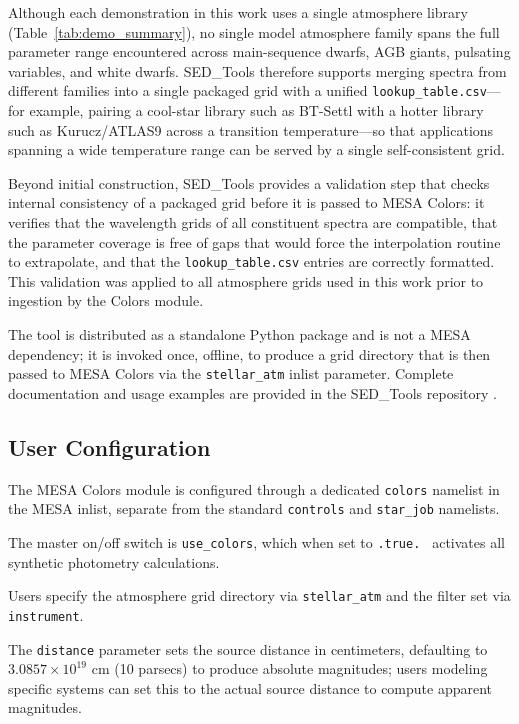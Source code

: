 \documentclass[linenumbers,apj,twocolumn, floatfix]{aastex701}
\begin{document}
Although each demonstration in this work uses a single atmosphere library (Table~\ref{tab:demo_summary}), no single model atmosphere family spans the full parameter range encountered across main-sequence dwarfs, AGB giants, pulsating variables, and white dwarfs.
SED\_Tools therefore supports merging spectra from different families into a single packaged grid with a unified \texttt{lookup\_table.csv}---for example, pairing a cool-star library such as BT-Settl with a hotter library such as Kurucz/ATLAS9 across a transition temperature---so that applications spanning a wide temperature range can be served by a single self-consistent grid.

Beyond initial construction, SED\_Tools provides a validation step that checks internal consistency of a packaged grid before it is passed to MESA Colors: it verifies that the wavelength grids of all constituent spectra are compatible, that the parameter coverage is free of gaps that would force the interpolation routine to extrapolate, and that the \texttt{lookup\_table.csv} entries are correctly formatted.
This validation was applied to all atmosphere grids used in this work prior to ingestion by the Colors module.

The tool is distributed as a standalone Python package and is not a MESA dependency; it is invoked once, offline, to produce a grid directory that is then passed to MESA Colors via the \texttt{stellar\_atm} inlist parameter.
Complete documentation and usage examples are provided in the SED\_Tools repository \citep{SED_Tools}.

\subsection{User Configuration}
\label{sec:user_workflow}

The MESA Colors module is configured through a dedicated \texttt{colors} namelist in the MESA inlist, separate from the standard \texttt{controls} and \texttt{star\_job} namelists.

The master on/off switch is \texttt{use\_colors}, which when set to \texttt{.true.
}
activates all synthetic photometry calculations.

Users specify the atmosphere grid directory via \texttt{stellar\_atm} and the filter set via \texttt{instrument}.

The \texttt{distance} parameter sets the source distance in centimeters, defaulting to $3.0857 \times 10^{19}$ cm (10 parsecs) to produce absolute magnitudes; users modeling specific systems can set this to the actual source distance to compute apparent magnitudes.
\end{document}
